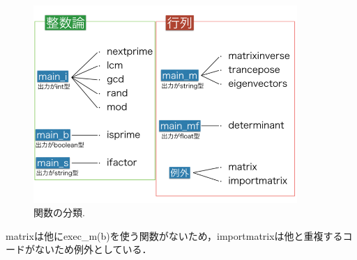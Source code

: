 \newpage

\begin{figure}[htbp]\begin{center}
\includegraphics[width=10cm,bb= 0 0 737 553]{../figs/./mapleruby_eringi.007.png}
\caption{関数の分類.}
\label{default}\end{center}\end{figure}
matrixは他にexec\_m(b)を使う関数がないため，importmatrixは他と重複するコードがないため例外としている．

